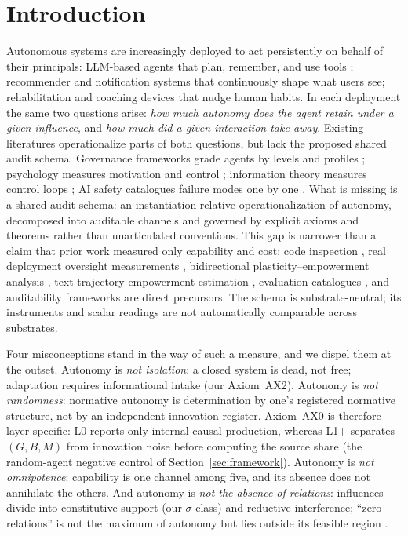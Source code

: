 \section{Introduction}\label{sec:intro}

Autonomous systems are increasingly deployed to act persistently on behalf of
their principals: LLM-based agents that plan, remember, and use tools
\citep{wang2023,xi2023,park2023}; recommender and notification systems that
continuously shape what users see; rehabilitation and coaching devices that
nudge human habits. In each deployment the same two questions arise:
\emph{how much autonomy does the agent retain under a given influence}, and
\emph{how much did a given interaction take away}. Existing literatures
operationalize parts of both questions, but lack the proposed shared audit
schema. Governance frameworks grade agents by levels and
profiles \citep{feng2025,kasirzadeh2025,dung2024}; psychology measures
motivation and control \citep{ryan_deci2000,maier_seligman2016}; information
theory measures control loops \citep{klyubin2005,massey1990}; AI safety
catalogues failure modes one by one
\citep{amodei2016,everitt2021,greshake2023}. What is missing is a shared
audit schema: an instantiation-relative operationalization of autonomy,
decomposed into auditable channels and governed by explicit axioms and
theorems rather than unarticulated conventions. This gap is narrower than a
claim that prior work measured only capability and cost: code inspection
\citep{cihon2025}, real deployment oversight measurements
\citep{anthropic2026agents}, bidirectional plasticity--empowerment analysis
\citep{abel2025plasticity}, text-trajectory empowerment estimation
\citep{song2026eelma}, evaluation catalogues
\citep{lassiter2026compendium}, and auditability frameworks
\citep{nian2026auditable} are direct precursors. The schema is
substrate-neutral; its instruments and scalar readings are not automatically
comparable across substrates.

Four misconceptions stand in the way of such a measure, and we dispel them at
the outset. Autonomy is \emph{not isolation}: a closed system is dead, not
free; adaptation requires informational intake (our Axiom~AX2). Autonomy is
\emph{not randomness}: normative autonomy is determination by one's registered
normative structure, not by an independent innovation register. Axiom~AX0 is
therefore layer-specific: L0 reports only internal-causal production, whereas
L1+ separates $(G,B,M)$ from innovation noise before computing the source
share (the random-agent negative control of Section~\ref{sec:framework}). Autonomy is \emph{not omnipotence}:
capability is one channel among five, and its absence does not annihilate the
others. And autonomy is \emph{not the absence of relations}: influences divide
into constitutive support (our $\sigma$ class) and reductive interference;
``zero relations'' is not the maximum of autonomy but lies outside its feasible
region \citep{mackenzie_stoljar2000}.

